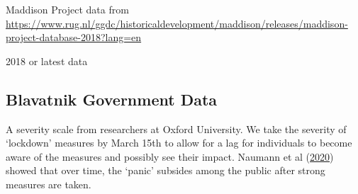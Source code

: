 \documentclass[
]{article}
\newenvironment{Shaded}{\begin{snugshade}}{\end{snugshade}}
\newcommand{\DataTypeTok}[1]{\textcolor[rgb]{0.13,0.29,0.53}{#1}}
\newcommand{\DecValTok}[1]{\textcolor[rgb]{0.00,0.00,0.81}{#1}}
\newcommand{\FloatTok}[1]{\textcolor[rgb]{0.00,0.00,0.81}{#1}}
\newcommand{\KeywordTok}[1]{\textcolor[rgb]{0.13,0.29,0.53}{\textbf{#1}}}
\newcommand{\NormalTok}[1]{#1}
\newcommand{\OperatorTok}[1]{\textcolor[rgb]{0.81,0.36,0.00}{\textbf{#1}}}
\newcommand{\StringTok}[1]{\textcolor[rgb]{0.31,0.60,0.02}{#1}}
\begin{document}
Maddison Project data from
\url{https://www.rug.nl/ggdc/historicaldevelopment/maddison/releases/maddison-project-database-2018?lang=en}

2018 or latest data

\begin{Shaded}
\end{Shaded}

\hypertarget{blavatnik-government-data}{%
\subsection{Blavatnik Government Data}\label{blavatnik-government-data}}

A severity scale from researchers at Oxford University. We take the
severity of `lockdown' measures by March 15th to allow for a lag for
individuals to become aware of the measures and possibly see their
impact. Naumann et al
(\href{https://www.uni-mannheim.de/media/Einrichtungen/gip/Corona_Studie/Schwerpunktbericht_Angstempfinden_Mannheimer_Corona_Studie.pdf}{2020})
showed that over time, the `panic' subsides among the public after
strong measures are taken.
\end{document}
